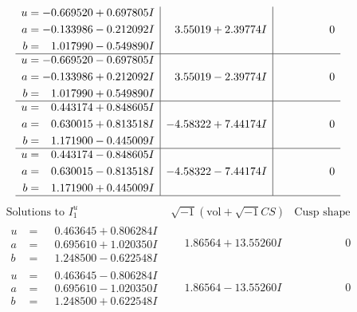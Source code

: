 \documentclass[1p]{elsarticle_modified}
\theoremstyle{definition}
\newcommand{\I}{\sqrt{-1}}
\begin{document}
$$\begin{array}{c|c|c}
\begin{aligned}
u &= -0.669520 + 0.697805 I \\
a &= -0.133986 - 0.212092 I \\
b &= \phantom{-}1.017990 - 0.549890 I\end{aligned}
 & \phantom{-}3.55019 + 2.39774 I & \phantom{-0.000000 } 0 \\ \hline\begin{aligned}
u &= -0.669520 - 0.697805 I \\
a &= -0.133986 + 0.212092 I \\
b &= \phantom{-}1.017990 + 0.549890 I\end{aligned}
 & \phantom{-}3.55019 - 2.39774 I & \phantom{-0.000000 } 0 \\ \hline\begin{aligned}
u &= \phantom{-}0.443174 + 0.848605 I \\
a &= \phantom{-}0.630015 + 0.813518 I \\
b &= \phantom{-}1.171900 - 0.445009 I\end{aligned}
 & -4.58322 + 7.44174 I & \phantom{-0.000000 } 0 \\ \hline\begin{aligned}
u &= \phantom{-}0.443174 - 0.848605 I \\
a &= \phantom{-}0.630015 - 0.813518 I \\
b &= \phantom{-}1.171900 + 0.445009 I\end{aligned}
 & -4.58322 - 7.44174 I & \phantom{-0.000000 } 0\\
 \hline 
 \end{array}$$\newpage$$\begin{array}{c|c|c}  
\text{Solutions to }I^u_{1}& \I (\text{vol} + \sqrt{-1}CS) & \text{Cusp shape}\\
 \hline 
\begin{aligned}
u &= \phantom{-}0.463645 + 0.806284 I \\
a &= \phantom{-}0.695610 + 1.020350 I \\
b &= \phantom{-}1.248500 - 0.622548 I\end{aligned}
 & \phantom{-}1.86564 + 13.55260 I & \phantom{-0.000000 } 0 \\ \hline\begin{aligned}
u &= \phantom{-}0.463645 - 0.806284 I \\
a &= \phantom{-}0.695610 - 1.020350 I \\
b &= \phantom{-}1.248500 + 0.622548 I\end{aligned}
 & \phantom{-}1.86564 - 13.55260 I & \phantom{-0.000000 } 0 \\ \hline\begin{aligned}

\end{aligned}
\end{array}$$
\end{document}
